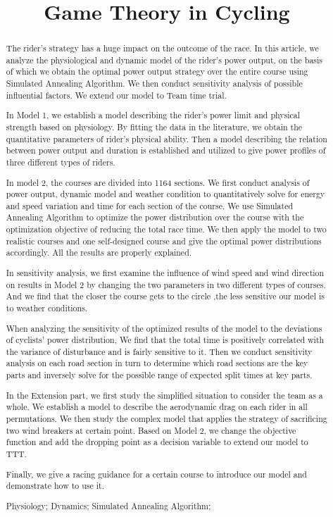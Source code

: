 \documentclass{mcmthesis}
\title{Game Theory in Cycling}
\date{}
\begin{document}
\begin{abstract}
	
The rider's strategy has a huge impact on the outcome of the race. In this article, we analyze the physiological and dynamic model of the rider's power output, on the basis of which we obtain the optimal power output strategy over the entire course using Simulated Annealing Algorithm. We then conduct sensitivity analysis of possible influential factors. We extend our model to Team time trial.

In Model 1, we establish a model describing the rider's power limit and physical strength based on physiology. By fitting the data in the literature, we obtain the quantitative parameters of rider's physical ability. Then a model describing the relation between power output and duration is established and utilized to give power profiles of three different types of riders.

In model 2, the courses are divided into 1164 sections. We first conduct analysis of power output, dynamic model and weather condition to quantitatively solve for energy and speed variation and time for each section of the course. We use Simulated Annealing Algorithm to optimize the power distribution over the course with the optimization objective of reducing the total race time. We then apply the model to two realistic courses and one self-designed course and give the optimal power distributions accordingly. All the results are properly explained.

In sensitivity analysis, we first examine the influence of wind speed and wind direction on results in Model 2 by changing the two parameters in two different types of courses. And we find that the closer the course gets to the circle ,the less sensitive our model is to weather conditions.

When analyzing the sensitivity of the optimized results of the model to the deviations of cyclists' power distribution, We find that the total time is positively correlated with the variance of disturbance and is fairly sensitive to it. Then we conduct sensitivity analysis on each road section in turn to determine which road sections are the key parts and inversely solve for the possible range of expected split times at key parts.

In the Extension part, we first study the simplified situation to consider the team as a whole. We establish a model to describe the aerodynamic drag on each rider in all permutations. We then study the complex model that applies the strategy of sacrificing two wind breakers at certain point. Based on Model 2, we change the objective function and add the dropping point as a decision variable to extend our model to TTT.

Finally, we give a racing guidance for a certain course to introduce our model and demonstrate how to use it.



\begin{keywords}
Physiology; Dynamics; Simulated Annealing Algorithm; 
\end{keywords}
\end{abstract}
\end{document}
